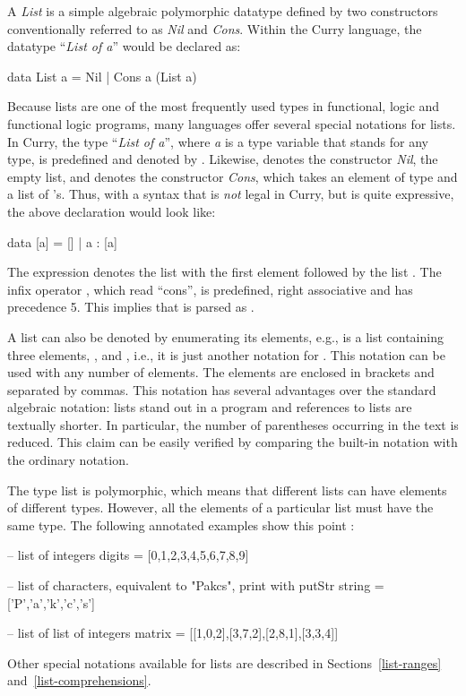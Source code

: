 A \emph{List} is a simple algebraic polymorphic
datatype defined by two constructors conventionally referred to
as \emph{Nil} and \emph{Cons}.
Within the Curry language, the datatype ``\emph{List of a}''
would be declared as:
%
\begin{curry}
data List a = Nil | Cons a (List a)
\end{curry}
%
Because lists are one of the most frequently used types in
functional, logic and functional logic programs,
many languages offer several special notations for lists.
In Curry, the type ``\emph{List of a}'',
where \emph{a} is a type variable that stands for any type,
is predefined and denoted by \code{[a]}.
Likewise, \code{[]} denotes the constructor \emph{Nil}, the empty list,
and \ccode{:}\pindex{:} denotes the constructor \emph{Cons}, which
takes an element of type  and a list of 's.
Thus, with a syntax that is \emph{not} legal in Curry, but
is quite expressive, the above declaration would look like:
%
\begin{curry}
data [a] = [] | a : [a]
\end{curry}
%
The expression  denotes the list with the first element 
followed by the list .
The infix operator \ccode{:}, which read ``cons'',
is predefined, right associative and has precedence 5.
This implies that  is parsed as .

A list can also be denoted by enumerating its
elements, e.g.,
\ccode{[u,v,w]} is a list containing three elements,
,  and , i.e., it is just another
notation for .
This notation can be used with any number of elements.
The elements are enclosed in brackets and separated by commas.
This notation has several advantages over the standard algebraic
notation: lists stand out in a program and references to lists
are textually shorter.  In particular, the number of parentheses
occurring in the text is reduced.
This claim can be easily verified by comparing the built-in
notation with the ordinary notation.

The type list is polymorphic, which means that
different lists can have elements of different types.
However, all the elements of a particular list must have the same type.
The following annotated examples show this point
:
%
\begin{curry}
-- list of integers
digits = [0,1,2,3,4,5,6,7,8,9]

-- list of characters, equivalent to "Pakcs", print with putStr
string = ['P','a','k','c','s'] 

-- list of list of integers
matrix = [[1,0,2],[3,7,2],[2,8,1],[3,3,4]]
\end{curry}
%
Other special notations available for lists are described in 
Sections~\ref{list-ranges} and~\ref{list-comprehensions}.

